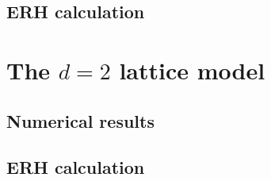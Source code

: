 \subsection{ERH calculation}



\section{The $d=2$ lattice model}

\subsection{Numerical results}

\subsection{ERH calculation}



